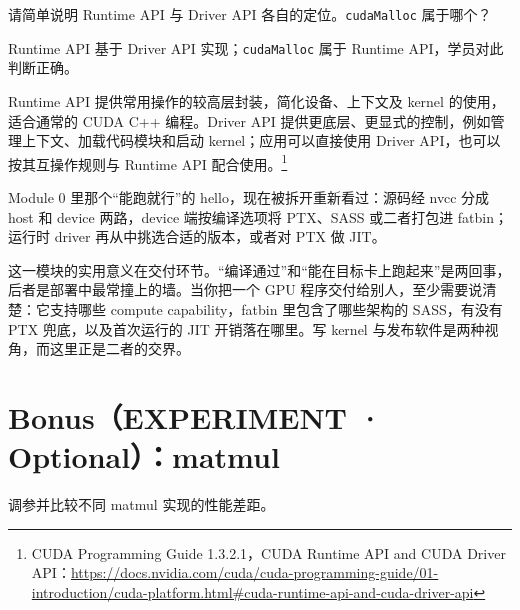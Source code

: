 \documentclass[11pt,a4paper,fontset=none]{ctexart}
\begin{document}
\clearpage
{}
请简单说明 Runtime API 与 Driver API 各自的定位。\texttt{cudaMalloc} 属于哪个？

\begin{tcolorbox}[title={8.3 作答（讨论后整理）}]
Runtime API 基于 Driver API 实现；\texttt{cudaMalloc} 属于 Runtime API，学员对此判断正确。

Runtime API 提供常用操作的较高层封装，简化设备、上下文及 kernel 的使用，适合通常的 CUDA C++ 编程。Driver API 提供更底层、更显式的控制，例如管理上下文、加载代码模块和启动 kernel；应用可以直接使用 Driver API，也可以按其互操作规则与 Runtime API 配合使用。\footnote{CUDA Programming Guide 1.3.2.1，CUDA Runtime API and CUDA Driver API：\url{https://docs.nvidia.com/cuda/cuda-programming-guide/01-introduction/cuda-platform.html\#cuda-runtime-api-and-cuda-driver-api}}
\end{tcolorbox}

\begin{lookback}
Module 0 里那个“能跑就行”的 hello，现在被拆开重新看过：源码经 nvcc 分成 host 和 device 两路，device 端按编译选项将 PTX、SASS 或二者打包进 fatbin；运行时 driver 再从中挑选合适的版本，或者对 PTX 做 JIT。

这一模块的实用意义在交付环节。“编译通过”和“能在目标卡上跑起来”是两回事，后者是部署中最常撞上的墙。当你把一个 GPU 程序交付给别人，至少需要说清楚：它支持哪些 compute capability，fatbin 里包含了哪些架构的 SASS，有没有 PTX 兜底，以及首次运行的 JIT 开销落在哪里。写 kernel 与发布软件是两种视角，而这里正是二者的交界。
\end{lookback}

\clearpage
\section*{Bonus（EXPERIMENT · Optional）：matmul}

调参并比较不同 matmul 实现的性能差距。
\end{document}
